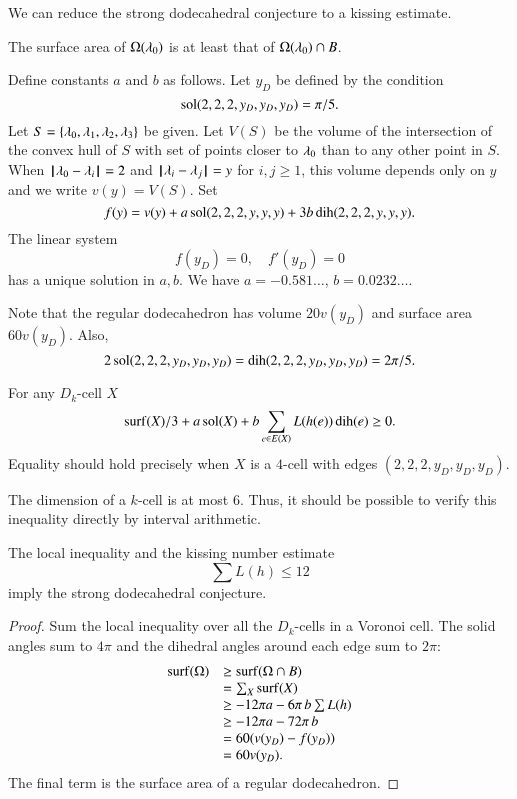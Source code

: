 We can reduce the strong dodecahedral conjecture to a kissing estimate.

\begin{lemma} The surface area of $\Omega(\lambda_0)$ is at least that
of $\Omega(\lambda_0)\cap B$.
\end{lemma}

\begin{definition}
Define constants $a$ and $b$ as follows.  Let $y_D$ be defined
by the condition
$$
\operatorname{sol}(2,2,2,y_D,y_D,y_D) = \pi/5.
$$
Let $S=\{\lambda_0,\lambda_1,\lambda_2,\lambda_3\}$ be given.  Let $V(S)$ be the
volume of the intersection of the convex hull of $S$ with set of points closer to $\lambda_0$ than to any other point in $S$.  When ${\hskip0.1em|\hskip-0.15em|\hskip0.1em}\lambda_0 - \lambda_i{\hskip0.1em|\hskip-0.15em|\hskip0.1em} = 2$ and ${\hskip0.1em|\hskip-0.15em|\hskip0.1em}\lambda_i - \lambda_j{\hskip0.1em|\hskip-0.15em|\hskip0.1em} = y$ for $i,j\ge 1$, this volume depends
only on $y$ and we write $v(y) = V(S)$.  Set
$$
f(y) = v(y) + a \operatorname{sol}(2,2,2,y,y,y) + 3 b \operatorname{dih}(2,2,2,y,y,y).
$$
The linear system
$$
f(y_D) = 0,\quad f'(y_D) = 0
$$
has a unique solution in $a,b$.  We have $a=-0.581\ldots$, $b=0.0232\ldots$.
\end{definition}

Note that the regular dodecahedron has volume $20 v(y_D)$ and surface area $60 v(y_D)$.  Also,
$$
2\operatorname{sol}(2,2,2,y_D,y_D,y_D) =\operatorname{dih}(2,2,2,y_D,y_D,y_D)=2\pi/5.
$$

\begin{conjecture}  For any $D_k$-cell $X$
$$
{\operatorname{surf}}(X)/3 + a \operatorname{sol}(X) + b \sum_{e\in E(X)} L(h(e)) \operatorname{dih}(e) \ge 0.
$$
Equality should hold precisely when $X$ is a $4$-cell with edges
$(2,2,2,y_D,y_D,y_D)$.
\end{conjecture}

\begin{note} %
The dimension of a $k$-cell is at most $6$.  Thus, it should be possible to verify this inequality directly by interval arithmetic.
\end{note}

\begin{lemma}  The local inequality and the kissing number estimate
$$
\sum L(h) \le 12
$$
imply the strong dodecahedral conjecture.
\end{lemma}

\begin{proof} 
Sum the local inequality over all the $D_k$-cells in a Voronoi cell.  The solid angles sum to $4\pi$ and the dihedral angles around each edge sum to $2\pi$:
$$
\begin{array}{lll}
{\operatorname{surf}}(\Omega) &\ge {\operatorname{surf}}(\Omega\cap B)\\
&=\sum_X {\operatorname{surf}}(X)\\
&\ge -12\pi a - 6\pi\, b  \sum L(h)\\
&\ge -12\pi a - 72\pi\, b\\
&= 60 (v(y_D) - f(y_D))\\
&= 60 v(y_D).\\
\end{array}
$$
The final term is the surface area of a regular dodecahedron.
\end{proof}

